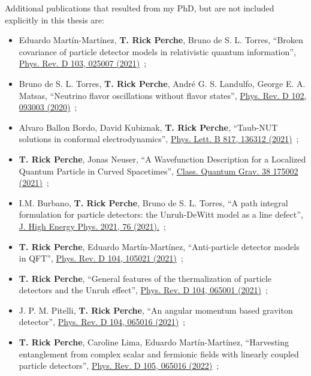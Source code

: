 Additional publications that resulted from my PhD, but are not included explicitly in this thesis are:
\begin{itemize}
    \item[(12)] Eduardo Martín-Martínez, \textbf{T. Rick Perche}, Bruno de S. L. Torres, ``Broken covariance of particle detector models in relativistic quantum information'', \href{https://doi.org/10.1103/PhysRevD.103.025007}{Phys. Rev. D 103, 025007 (2021)}~\cite{us2};
    \item[(13)] Bruno de S. L. Torres, \textbf{T. Rick Perche}, André G. S. Landulfo, George E. A. Matsas, ``Neutrino flavor oscillations without flavor states'', \href{https://doi.org/10.1103/PhysRevD.102.093003}{Phys. Rev. D 102, 093003 (2020)}~\cite{neutrinos};
    \item[(14)] Alvaro Ballon Bordo, David Kubiznak, \textbf{T. Rick Perche}, ``Taub-NUT solutions in conformal electrodynamics'', \href{https://doi.org/10.1016/j.physletb.2021.136312}{Phys. Lett. B 817, 136312 (2021)}~\cite{alvaro};
    \item[(15)] \textbf{T. Rick Perche}, Jonas Neuser, ``A Wavefunction Description for a Localized Quantum Particle in Curved Spacetimes'', \href{https://iopscience.iop.org/article/10.1088/1361-6382/ac103d}{Class. Quantum Grav. 38 175002 (2021)}~\cite{jonas};
    \item[(16)] I.M. Burbano, \textbf{T. Rick Perche}, Bruno de S. L. Torres, ``A path integral formulation for particle detectors: the Unruh-DeWitt model as a line defect'', \href{https://link.springer.com/article/10.1007/JHEP03(2021)076}{J. High Energy Phys. 2021, 76 (2021).}~\cite{ivan};
    \item[(17)] \textbf{T. Rick Perche}, Eduardo Martín-Martínez, ``Anti-particle detector models in QFT'', \href{https://doi.org/10.1103/PhysRevD.104.105021}{Phys. Rev. D 104, 105021 (2021)}~\cite{antiparticles};
    \item[(18)] \textbf{T. Rick Perche}, ``General features of the thermalization of particle detectors and the Unruh effect'', \href{https://doi.org/10.1103/PhysRevD.104.065001}{Phys. Rev. D 104, 065001 (2021)}~\cite{mine};
    \item[(19)] J. P. M. Pitelli, \textbf{T. Rick Perche}, ``An angular momentum based graviton detector'', \href{https://doi.org/10.1103/PhysRevD.104.065016}{Phys. Rev. D 104, 065016 (2021)}~\cite{pitelli};
    \item[(20)] \textbf{T. Rick Perche}, Caroline Lima, Eduardo Martín-Martínez, ``Harvesting entanglement from complex scalar and fermionic fields with linearly coupled particle detectors'', \href{https://doi.org/10.1103/PhysRevD.105.065016}{Phys. Rev. D 105, 065016 (2022)}~\cite{carol};

\end{itemize}
